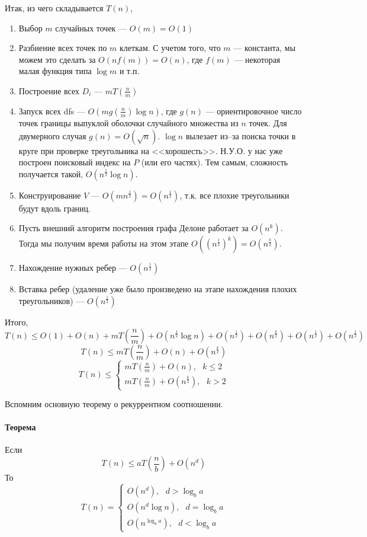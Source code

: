 \documentclass{article}
\begin{document}
    Итак, из чего складывается $T(n)$,
    \begin{enumerate}
        \item Выбор $m$ случайных точек --- $O(m) = O(1)$
        \item Разбиение всех точек по $m$ клеткам. С учетом того, что $m$ --- константа, мы можем это сделать за $O(n f(m)) = O(n)$, где $f(m)$ --- некоторая малая функция типа $\log m$ и т.п.
        \item Построение всех $D_i$ --- $m T(\frac{n}{m})$
        \item Запуск всех dfs --- $O(m g(\frac{n}{m}) \log n)$, где $g(n)$ --- ориентировочное число точек границы выпуклой оболочки случайного множества из $n$ точек. Для двумерного случая $g(n) = O(\sqrt{n})$. $\log n$ вылезает из--за поиска точки в круге при проверке треугольника на <<хорошесть>>. Н.У.О. у нас уже построен поисковый индекс на $P$ (или его частях). Тем самым, сложность получается такой, $O(n^{\frac{1}{2}} \log n)$.
        \item Конструирование $V$ --- $O(m n^{\frac{1}{2}}) = O(n^{\frac{1}{2}})$, т.к. все плохие треугольники будут вдоль границ.
        \item Пусть внешний алгоритм построения графа Делоне работает за $O(n^k)$. Тогда мы получим время работы на этом этапе $O((n^{\frac{1}{2}})^k) = O(n^\frac{k}{2})$.  
        \item Нахождение нужных ребер --- $O(n^\frac{1}{2})$
        \item Вставка ребер (удаление уже было произведено на этапе нахождения плохих треугольников) --- $O(n^\frac{1}{2})$
    \end{enumerate}
    
    Итого, 
    $$
        T(n) \le O(1) + O(n) + m T\left( \frac{n}{m}  \right) + O(n^\frac{1}{2} \log n) + O(n^{\frac{1}{2}}) + O(n^\frac{k}{2}) + O(n^\frac{1}{2}) + O(n^\frac{1}{2})
    $$    
    $$
        T(n) \le m T \left( \frac{n}{m} \right) + O(n) + O(n^\frac{k}{2})
    $$
    $$
        T(n) \le \left\{
            	\begin{array}{c}
				m T \left( \frac{n}{m} \right) + O(n), ~~~ k \le 2	\\
				m T \left( \frac{n}{m} \right) + O(n^\frac{k}{2}), ~~~ k > 2
			\end{array}
		\right.		
	$$
	
	Вспомним основную теорему о рекуррентном соотношении.
	
	\paragraph{Теорема\\}
	    Если 
	    $$
	        T(n) \le a T \left( \frac{n}{b} \right) + O(n^d)
	    $$
	    То
	    $$
	        T(n) = \left\{
            	    \begin{array}{c}
				    O(n^d), ~~~ d > \log_b a    \\
				    O(n^d \log n), ~~~ d = \log_b a    \\
				    O(n^{\log_b a}), ~~~ d < \log_b a
			    \end{array}
		    \right.		
	    $$
	    
\end{document}
